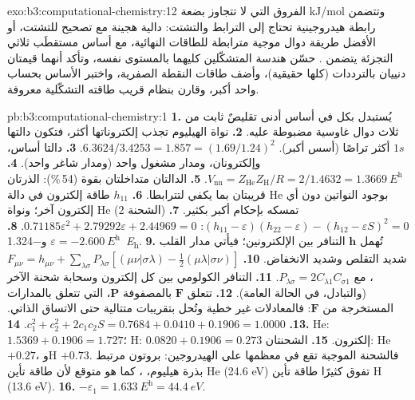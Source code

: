 \begin{solution}{exo:b3:computational-chemistry:12}
الفروق التي لا تتجاوز بضعة \unit{kJ/mol} وتتضمن رابطة هيدروجينية تحتاج إلى الترابط 
والتشتت: دالية هجينة مع تصحيح للتشتت، أو الأفضل طريقة
دوال موجية مترابطة للطاقات النهائية، مع أساس مستقطَب
ثلاثي التجزئة يتضمن . حسّن هندسة المتشكّلين كليهما بالمستوى
نفسه، وتأكد أنهما قيمتان دنييان بالترددات (كلها حقيقية)، وأضف طاقات
النقطة الصفرية، واختبر الأساس بحساب واحد أكبر، وقارن بنظام
قريب طاقته التشكّلية معروفة.
\end{solution}

\begin{solution}{pb:b3:computational-chemistry:1}
\textbf{1.} يُستبدل بكل  في أساس أدنى تقليصٌ
ثابت من ثلاث دوال غاوسية مضبوطة عليه.
\textbf{2.} نواة الهيليوم تجذب إلكتروناتها أكثر، فتكون دالتها $1s$
أكثر تراصًا (أسس أكبر). $6.3624/3.4253 = 1.857 = (1.69/1.24)^2$.
\textbf{3.} دالتا أساس، وإلكترونان، ومدار مشغول واحد (ومدار
شاغر واحد).
\textbf{4.} $V_{\mathrm{nn}} = Z_{\mathrm{He}}Z_{\mathrm H}/R = 2/1.4632 =
\qty{1.3669}{\hartree}$.
\textbf{5.} الدالتان متداخلتان بقوة (54\,\%): الذرتان قريبتان
بما يكفي لتترابطا.
\textbf{6.} $h_{11}$ طاقة إلكترون في دالة He بوجود النواتين
دون أي إلكترون آخر؛ ونواة He (الشحنة 2) تمسكه بإحكام
أكبر بكثير.
\textbf{7.} $(h_{11} - \varepsilon)(h_{22} - \varepsilon) - (h_{12} - \varepsilon S)^2 = 0$:
$0.71185\varepsilon^2 + 2.79292\varepsilon + 2.44969 = 0$.
\textbf{8.} $\varepsilon = \qty{-2.600}{\hartree}$ و\qty{-1.324}{\hartree}.
\textbf{9.} تُهمل $\mathbf h$ التنافر بين الإلكترونين؛ فيأتي مدار
القلب شديد التقلص وشديد الانخفاض.
\textbf{10.} $F_{\mu\nu} = h_{\mu\nu} + \sum_{\lambda\sigma}P_{\lambda\sigma}[(\mu\nu|\sigma\lambda) -
\frac12(\mu\lambda|\sigma\nu)]$، مع $P_{\lambda\sigma} = 2C_{\lambda1}C_{\sigma1}$.
\textbf{11.} التنافر الكولومي بين كل إلكترون وسحابة شحنة
الآخر (والتبادل، في الحالة العامة).
\textbf{12.} تتعلق $\mathbf F$ بالمصفوفة $\mathbf P$، التي تتعلق بالمدارات المستخرجة
من $\mathbf F$: فالمعادلات غير خطية وتُحل بتقريبات
متتالية حتى الاتساق الذاتي.
\textbf{13.} $c_1^2 + c_2^2 + 2c_1c_2S = 0.7684 + 0.0410 + 0.1906 = 1.0000$.
\textbf{14.} He: $1.5369 + 0.1906 = 1.727$؛ H: $0.0820 + 0.1906 = 0.273$
إلكترون.
\textbf{15.} الشحنتان: He $+0.27$، وH $+0.73$. فالشحنة الموجبة تقع في معظمها على
الهيدروجين:  بروتون مرتبط بذرة هيليوم، ، كما هو متوقع
لأن طاقة تأين He (24.6 eV) تفوق كثيرًا طاقة تأين H (13.6 eV).
\textbf{16.} $-\varepsilon_1 = \qty{1.633}{\hartree} = \qty{44.4}{eV}$.

\end{solution}
